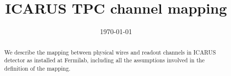 \documentclass{article}
\title{ICARUS TPC channel mapping}
\date{\today}
\begin{document}

\maketitle

\begin{abstract}
We describe the mapping between physical wires and readout channels in ICARUS
detector as installed at Fermilab,
including all the assumptions involved in the definition of the mapping.
\end{abstract}

\tableofcontents

















\end{document}
